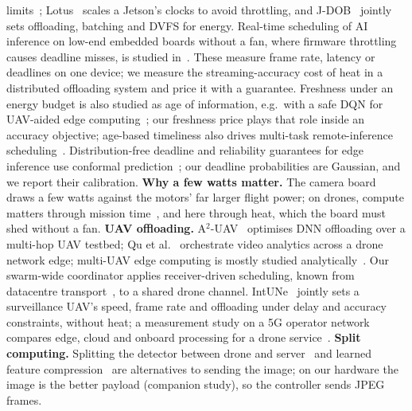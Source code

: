 \documentclass[conference]{IEEEtran}
\begin{document}
limits~\cite{Choi_2024}; Lotus~\cite{Gong_2024} scales a Jetson's clocks to avoid throttling, and J-DOB~\cite{Xu_2025}
jointly sets offloading, batching and DVFS for energy. Real-time scheduling of AI inference on low-end embedded
boards without a fan, where firmware throttling causes deadline misses, is studied in~\cite{Sun_2026}. These measure
frame rate, latency or deadlines on one device; we measure the streaming-accuracy cost of
heat in a distributed offloading system and price it with a guarantee. Freshness under an energy budget is also studied
as age of information, e.g.\ with a safe DQN for UAV-aided edge computing~\cite{Zhao_2024}; our freshness price plays
that role inside an accuracy objective; age-based timeliness also drives multi-task remote-inference
scheduling~\cite{Shisher_2025}. Distribution-free deadline and reliability guarantees for edge inference use conformal
prediction~\cite{Kalor_2025,Binucci_2025}; our deadline probabilities are Gaussian, and we report their calibration.
\textbf{Why a few watts matter.} The camera board draws a few watts against the motors' far larger flight power; on
drones, compute matters through mission time~\cite{Boroujerdian_2018}, and here through heat, which the board must
shed without a fan. \textbf{UAV offloading.} A$^2$-UAV~\cite{Coletta_2023} optimises DNN offloading over a multi-hop UAV testbed; Qu et al.~\cite{Qu_2024} orchestrate
video analytics across a drone network edge; multi-UAV edge computing is mostly studied analytically~\cite{Sun_2024,Hao_2024,Du_2026}. Our swarm-wide
coordinator applies receiver-driven scheduling, known from datacentre transport~\cite{Handley_2017,Montazeri_2018}, to a
shared drone channel. IntUNe~\cite{Varshney_2026}
jointly sets a surveillance UAV's speed, frame rate and offloading under delay and accuracy constraints, without
heat; a measurement study on a 5G operator network compares edge, cloud and onboard processing for a drone
service~\cite{CandalVentureira_2023}.
\textbf{Split computing.} Splitting the detector between drone and server~\cite{kang2017neurosurgeon,matsubara2022survey}
and learned feature compression~\cite{Matsubara_2022,Furutanpey_2024} are alternatives to sending the image; on our
hardware the image is the better payload (companion study), so the controller sends JPEG frames.
\end{document}
